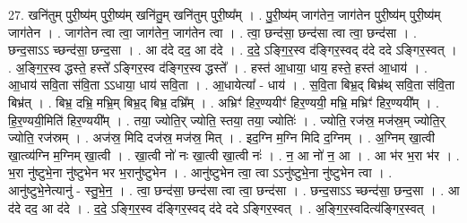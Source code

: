 \documentclass[17pt]{extarticle}
\begin{document}
27. खनि॑तुम् पुरी॒ष्य॑म् पुरी॒ष्य॑म् खनि॑तु॒म् खनि॑तुम् पुरी॒ष्य᳚म् । . पु॒री॒ष्य॑म् जाग॑तेन॒ जाग॑तेन पुरी॒ष्य॑म् पुरी॒ष्य॑म् जाग॑तेन । . जाग॑तेन त्वा त्वा॒ जाग॑तेन॒ जाग॑तेन त्वा । . त्वा॒ छन्द॑सा॒ छन्द॑सा त्वा त्वा॒ छन्द॑सा । . छन्द॒साऽऽ च्छन्द॑सा॒ छन्द॒सा । . आ द॑दे दद॒ आ द॑दे । . द॒दे॒ ऽङ्गि॒र॒स्व द॑ङ्गिर॒स्वद् द॑दे ददे ऽङ्गिर॒स्वत् । . अ॒ङ्गि॒र॒स्व द्धस्ते॒ हस्ते᳚ ऽङ्गिर॒स्व द॑ङ्गिर॒स्व द्धस्ते᳚ । . हस्त॑ आ॒धाया॒ धाय॒ हस्ते॒ हस्त॑ आ॒धाय॑ । . आ॒धाय॑ सवि॒ता स॑वि॒ता ऽऽधाया॒ धाय॑ सवि॒ता । . आ॒धायेत्या᳚ - धाय॑ । . स॒वि॒ता बिभ्र॒द् बिभ्र॑थ् सवि॒ता स॑वि॒ता बिभ्र॑त् । . बिभ्र॒ दभ्रि॒ मभ्रि॒म् बिभ्र॒द् बिभ्र॒ दभ्रि᳚म् । . अभ्रिꣳ॑ हिर॒ण्ययीꣳ॑ हिर॒ण्ययी॒ मभ्रि॒ मभ्रिꣳ॑ हिर॒ण्ययी᳚म् । . हि॒र॒ण्ययी॒मिति॑ हिर॒ण्ययी᳚म् । . तया॒ ज्योति॒र् ज्योति॒ स्तया॒ तया॒ ज्योतिः॑ । . ज्योति॒ रज॑स्र॒ मज॑स्र॒म् ज्योति॒र् ज्योति॒ रज॑स्रम् । . अज॑स्र॒ मिदि दज॑स्र॒ मज॑स्र॒ मित् । . इद॒ग्नि म॒ग्नि मिदि द॒ग्निम् । . अ॒ग्निम् खा॒त्वी खा॒त्व्य॑ग्नि म॒ग्निम् खा॒त्वी । . खा॒त्वी नो॑ नः खा॒त्वी खा॒त्वी नः॑ । . न॒ आ नो॑ न॒ आ । . आ भ॑र भ॒रा भ॑र । . भ॒रा नु॑ष्टुभे॒ना नु॑ष्टुभेन भर भ॒रानु॑ष्टुभेन । . आनु॑ष्टुभेन त्वा॒ त्वा ऽऽनु॑ष्टुभे॒ना नु॑ष्टुभेन त्वा । . आनु॑ष्टुभे॒नेत्यानु॑ - स्तु॒भे॒न॒ । . त्वा॒ छन्द॑सा॒ छन्द॑सा त्वा त्वा॒ छन्द॑सा । . छन्द॒साऽऽ च्छन्द॑सा॒ छन्द॒सा । . आ द॑दे दद॒ आ द॑दे । . द॒दे॒ ऽङ्गि॒र॒स्व द॑ङ्गिर॒स्वद् द॑दे ददे ऽङ्गिर॒स्वत् । . अ॒ङ्गि॒र॒स्वदित्य॑ङ्गिर॒स्वत् । \newline
\end{document}
